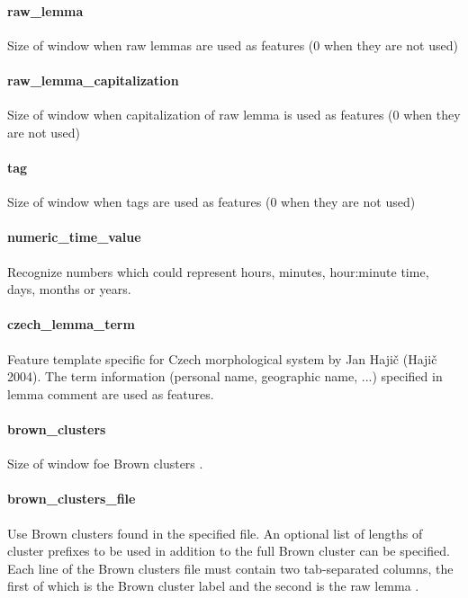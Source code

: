 \paragraph{raw\_lemma}
Size of window when raw lemmas are used as features (0 when they are not used)


\paragraph{raw\_lemma\_capitalization}
Size of window when capitalization of raw lemma is used as features (0 when they are not used)

\paragraph{tag}
Size of window when tags are used as features (0 when they are not used)

\paragraph{numeric\_time\_value}
Recognize numbers which could represent hours, minutes, hour:minute time, days,
months or years.

\paragraph{czech\_lemma\_term}
Feature template specific for Czech morphological system by Jan Hajič (Hajič 2004).
The term information (personal name, geographic name, ...) specified in lemma comment
are used as features.

\paragraph{brown\_clusters}
Size of window foe Brown clusters .

\paragraph{brown\_clusters\_file}
Use Brown clusters found in the specified file. An optional list of lengths of
cluster prefixes to be used in addition to the full Brown cluster can be specified.
Each line of the Brown clusters file must contain two tab-separated columns,
the first of which is the Brown cluster label and the second is the raw lemma .

